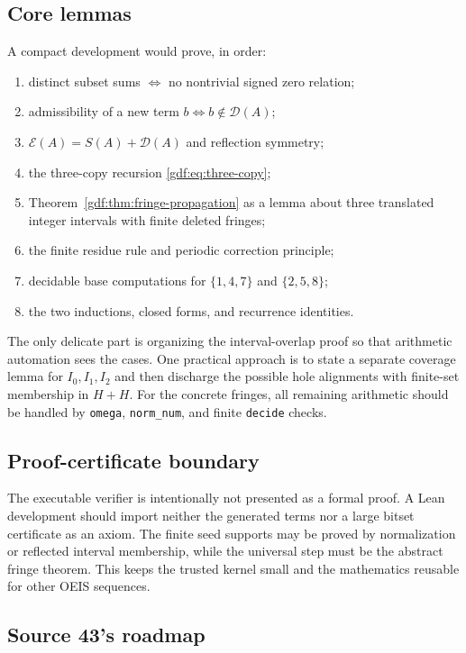 \documentclass[11pt,a4paper]{article}
\numberwithin{equation}{section}
\theoremstyle{definition}
\theoremstyle{remark}
\theoremstyle{plain}
\newcommand{\cD}{\mathcal D}
\newcommand{\cE}{\mathcal E}
\begin{document}
\subsection{Core lemmas}

A compact development would prove, in order:
\begin{enumerate}[label=(\arabic*)]
\item distinct subset sums $\Leftrightarrow$ no nontrivial signed zero
relation;
\item admissibility of a new term $b\Leftrightarrow b\notin\cD(A)$;
\item $\cE(A)=S(A)+\cD(A)$ and reflection symmetry;
\item the three-copy recursion \eqref{gdf:eq:three-copy};
\item Theorem~\ref{gdf:thm:fringe-propagation} as a lemma about three translated
integer intervals with finite deleted fringes;
\item the finite residue rule and periodic correction principle;
\item decidable base computations for $\{1,4,7\}$ and $\{2,5,8\}$;
\item the two inductions, closed forms, and recurrence identities.
\end{enumerate}

The only delicate part is organizing the interval-overlap proof so that
arithmetic automation sees the cases.  One practical approach is to state a
separate coverage lemma for $I_0,I_1,I_2$ and then discharge the possible
hole alignments with finite-set membership in $H+H$.  For the concrete
fringes, all remaining arithmetic should be handled by
\texttt{omega}, \texttt{norm\_num}, and finite \texttt{decide} checks.

\subsection{Proof-certificate boundary}

The executable verifier is intentionally not presented as a formal proof.
A Lean development should import neither the generated terms nor a large
bitset certificate as an axiom.  The finite seed supports may be proved by
normalization or reflected interval membership, while the universal step must
be the abstract fringe theorem.  This keeps the trusted kernel small and the
mathematics reusable for other OEIS sequences.

\subsection{Source 43's roadmap}
\end{document}
